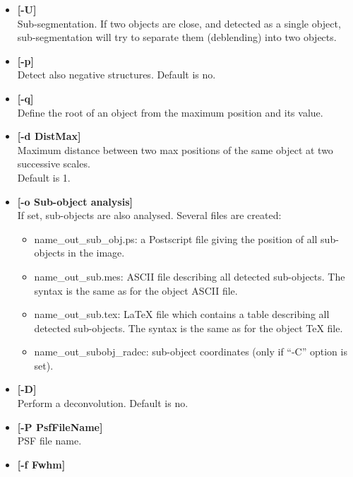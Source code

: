 \begin{itemize}
\begin{enumerate}
\begin{center}
\end{center}
\item  Two synthetic images \\
xx\_ellips.fits: an ellipse is drawn around each object \\
xx\_simu.fits: image created only from the morphological parameters 
\item  equivalent to 1 and 2 together 
\end{enumerate}
\item {\bf [-U]} \\
Sub-segmentation. If two objects are close, and detected as a single object,
sub-segmentation will try to separate them (deblending) into two objects.
\item {\bf [-p]} \\
Detect also negative structures. Default is no.
\item {\bf [-q]} \\
Define the root of an object from the maximum position and its value.
\item {\bf [-d DistMax]} \\
Maximum distance between two max positions 
of the same object at two successive scales. \\
Default is 1.
\item {\bf [-o Sub-object analysis]} \\
If set, sub-objects are also analysed. Several files are created:
\begin{itemize}
\baselineskip=0.4truecm
\item name\_out\_sub\_obj.ps: a Postscript file giving the position
of all sub-objects in the image.
\item name\_out\_sub.mes: ASCII file describing all detected sub-objects. 
The syntax is the same as for the object ASCII file.
\item name\_out\_sub.tex: LaTeX file which contains a table describing all detected
sub-objects.  The syntax is the same as for the object TeX file.
\item name\_out\_subobj\_radec: sub-object coordinates (only 
if ``-C'' option is set).
\end{itemize}
\item {\bf [-D]} \\
Perform a deconvolution. Default is no.
\item {\bf [-P PsfFileName]} \\
PSF file name.
\item {\bf [-f Fwhm]} \\

\end{itemize}
